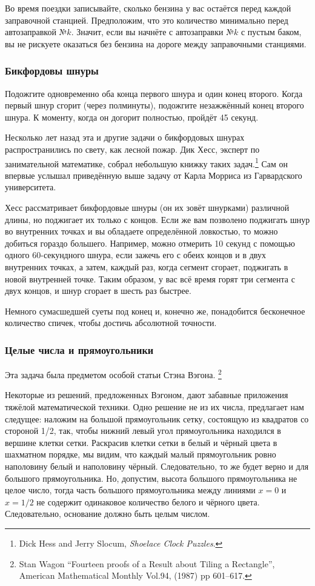 Во время поездки записывайте, сколько бензина у вас остаётся перед каждой заправочной станцией.
Предположим, что это количество минимально перед автозаправкой №$k$.
Значит, если вы начнёте с автозаправки №$k$ с пустым баком, вы не рискуете оказаться без бензина на дороге между заправочными станциями.\heart

\subsubsection*{Бикфордовы шнуры} %

Подожгите одновременно оба конца первого шнура и один конец второго.
Когда первый шнур сгорит (через полминуты), подожгите незажжённый конец второго шнура.
К моменту, когда он догорит полностью, пройдёт 45 секунд.
\heart

Несколько лет назад эта и другие задачи о бикфордовых шнурах распространились по свету, как лесной пожар.
Дик Хесс, эксперт по занимательной математике, 
собрал небольшую книжку таких задач.\footnote{Dick Hess and Jerry Slocum, \emph{Shoelace Clock Puzzles}.}
Сам он впервые услышал приведённую выше задачу от Карла Морриса из Гарвардского университета.

Хесс рассматривает бикфордовые шнуры (он их зовёт шнурками) различной длины, но поджигает их только с концов.
Если же вам позволено поджигать шнур во внутренних точках и вы обладаете определённой ловкостью, то можно добиться гораздо большего.
Например, можно отмерить 10 секунд с помощью одного 60-секундного шнура, если зажечь его с обеих концов и в двух внутренних точках, а затем, каждый раз, когда сегмент сгорает, поджигать в новой внутренней точке.
Таким образом, у вас всё время горят три сегмента с двух концов, и шнур сгорает в шесть раз быстрее.

Немного сумасшедшей суеты под конец и, конечно же, понадобится бесконечное количество спичек, чтобы достичь абсолютной точности.

\subsubsection*{Целые числа и прямоугольники} %

Эта задача была предметом особой 
статьи Стэна Вэгона.%
\footnote{Stan Wagon “Fourteen proofs of a Result about Tiling a Rectangle”, American Mathematical Monthly Vol.94, (1987) pp 601--617.}

Некоторые из решений, предложенных Вэгоном, дают забавные приложения тяжёлой математической техники.
Одно решение не из их числа, предлагает нам следущее:
наложим на большой прямоугольник сетку, состоящую из квадратов со стороной 1/2, так, чтобы нижний левый угол прямоугольника находился в вершине клетки сетки.
Раскрасив клетки сетки в белый и чёрный цвета в шахматном порядке, 
мы видим, что каждый малый прямоугольник ровно наполовину белый и наполовину чёрный.
Следовательно, то же будет верно и для большого прямоугольника.
Но, допустим, высота большого прямоугольника не целое число, тогда часть 
большого прямоугольника между линиями $x=0$ и $x=1/2$ не содержит одинаковое количество белого и чёрного цвета.
Следовательно, основание должно быть целым числом.\heart

